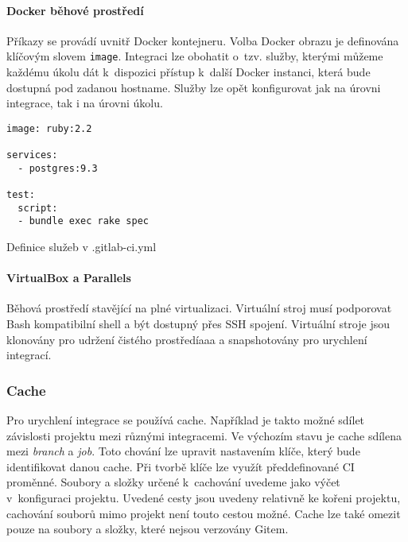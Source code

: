 \paragraph{Docker běhové prostředí}

Příkazy se provádí uvnitř Docker kontejneru.
Volba Docker obrazu je definována klíčovým slovem \verb|image|.
Integraci lze obohatit o~tzv. služby, kterými můžeme každému úkolu dát k~dispozici přístup k~další Docker instanci, která bude dostupná pod zadanou hostname.
Služby lze opět konfigurovat jak na úrovni integrace, tak i na úrovni úkolu.

\begin{listing}[ht]
\begin{verbatim}
image: ruby:2.2

services:
  - postgres:9.3

test:
  script:
  - bundle exec rake spec
\end{verbatim}
\caption{Definice služeb v .gitlab-ci.yml}
\end{listing}

\paragraph{VirtualBox a Parallels}

Běhová prostředí stavějící na plné virtualizaci.
Virtuální stroj musí podporovat Bash kompatibilní shell a být dostupný přes SSH spojení.
Virtuální stroje jsou klonovány pro udržení čistého prostředíaaa a snapshotovány pro urychlení integrací.


\subsubsection{Cache}


Pro urychlení integrace se používá cache.
Například je takto možné sdílet závislosti projektu mezi různými integracemi.
Ve výchozím stavu je cache sdílena mezi \textit{branch} a \textit{job}.
Toto chování lze upravit nastavením klíče, který bude identifikovat danou cache.
Při tvorbě klíče lze využít předdefinované CI proměnné. 
Soubory a složky určené k~cachování uvedeme jako výčet v~konfiguraci projektu.
Uvedené cesty jsou uvedeny relativně ke kořeni projektu, cachování souborů mimo projekt není touto cestou možné. %
Cache lze také omezit pouze na soubory a složky, které nejsou verzovány Gitem.

